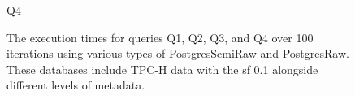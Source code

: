 \begin{figure}[h!]
\begin{minipage}[b]{0.45\linewidth}
    \caption*{Q4}
\end{minipage}
\caption[The execution times for queries Q1, Q2, Q3, and Q4 over 100 iterations]{The execution times for queries Q1, Q2, Q3, and Q4 over 100 iterations using various types of PostgresSemiRaw and PostgresRaw. These databases include TPC-H data with the \acrshort{sf} 0.1 alongside different levels of metadata.}
\label{fig:execution_time_group1}
\end{figure}
